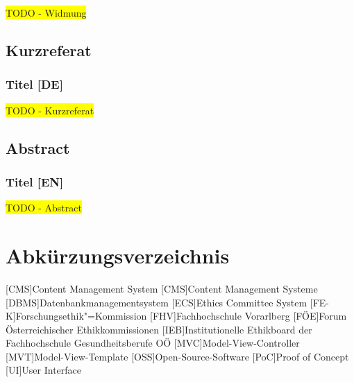 \documentclass[a4paper,12pt,twoside]{scrreprt}
\begin{document}
\colorbox{yellow}{TODO - Widmung}

\newpage
\section*{Kurzreferat}
\label{sec:abstract-de}

\subsection*{Titel [DE]}

\colorbox{yellow}{TODO - Kurzreferat}

\newpage
\section*{Abstract}
\label{sec:abstract-en}

\subsection*{Titel [EN]}

\colorbox{yellow}{TODO - Abstract}

\cleardoublepage
\tableofcontents

\clearpage
{}
{}
\listoffigures

\clearpage
{}
{}
\chapter*{Abkürzungsverzeichnis}

\begin{acronym}
    [CMS]{Content Management System}
    [CMS]{Content Management Systeme}
    [DBMS]{Datenbankmanagementsystem}
    [ECS]{Ethics Committee System}
    [FE-K]{Forschungsethik"=Kommission}
    [FHV]{Fachhochschule Vorarlberg}
    [FÖE]{Forum Österreichischer Ethikkommissionen}
    [IEB]{Institutionelle Ethikboard der Fachhochschule Gesundheitsberufe OÖ}
    [MVC]{Model-View-Controller}
    [MVT]{Model-View-Template}
    [OSS]{Open-Source-Software}
    [PoC]{Proof of Concept}
    [UI]{User Interface}
\end{acronym}
\end{document}
